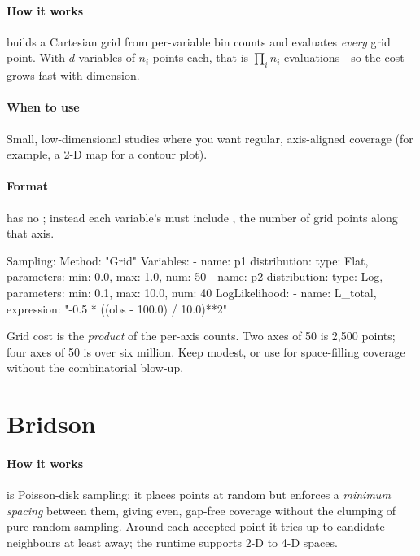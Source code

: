 \paragraph{How it works}  builds a Cartesian grid from per-variable bin counts and
evaluates \emph{every} grid point. With $d$ variables of $n_i$ points each, that is
$\prod_i n_i$ evaluations---so the cost grows fast with dimension.

\paragraph{When to use} Small, low-dimensional studies where you want regular, axis-aligned
coverage (for example, a 2-D map for a contour plot).

\paragraph{Format}  has no ; instead each variable's
 must include , the number of grid points along that axis.

\begin{yamlwin}
Sampling:
  Method: "Grid"
  Variables:
    - name: p1
      distribution: {type: Flat, parameters: {min: 0.0, max: 1.0, num: 50}}
    - name: p2
      distribution: {type: Log,  parameters: {min: 0.1, max: 10.0, num: 40}}
  LogLikelihood:
    - {name: L_total, expression: "-0.5 * ((obs - 100.0) / 10.0)**2"}
\end{yamlwin}

\begin{jwarn}
Grid cost is the \emph{product} of the per-axis counts. Two axes of 50 is 2{,}500 points;
four axes of 50 is over six million. Keep  modest, or use  for
space-filling coverage without the combinatorial blow-up.
\end{jwarn}

\section{Bridson}
\label{sec:s-bridson}

\paragraph{How it works}  is Poisson-disk sampling: it places points at random
but enforces a \emph{minimum spacing} between them, giving even, gap-free coverage without the
clumping of pure random sampling. Around each accepted point it tries up to 
candidate neighbours at least  away; the runtime supports 2-D to 4-D spaces.

